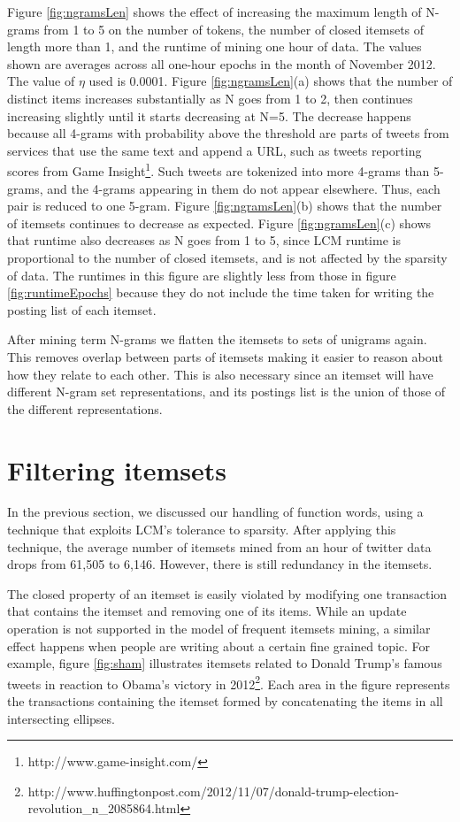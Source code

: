 \documentclass{sig-alternate}
\begin{document}
Figure \ref{fig:ngramsLen} shows the effect of increasing the maximum length
of N-grams from 1 to 5 on the number of tokens, the number of closed itemsets
of length more than 1, and the runtime of mining one hour of data.
The values shown are averages across all one-hour epochs in the month of
November 2012.
The value of $\eta$ used is 0.0001.
Figure \ref{fig:ngramsLen}(a) shows that the number of distinct items
increases substantially as N goes from 1 to 2, then continues increasing
slightly until it starts decreasing at N=5.
The decrease happens because all 4-grams with probability above the threshold
are parts of tweets from services that use the same text and append a URL,
such as tweets reporting scores from
Game Insight\footnote{http://www.game-insight.com/}.
Such tweets are tokenized into more 4-grams than 5-grams, and the 4-grams
appearing in them do not appear elsewhere.
Thus, each pair is reduced to one 5-gram.
Figure \ref{fig:ngramsLen}(b) shows that the number of itemsets continues to
decrease as expected.
Figure \ref{fig:ngramsLen}(c) shows that runtime also decreases as N goes
from 1 to 5, since LCM runtime is proportional to the number of closed
itemsets, and is not affected by the sparsity of data.
The runtimes in this figure are slightly less from those in
figure \ref{fig:runtimeEpochs} because they do not include the time taken for
writing the posting list of each itemset.


After mining term N-grams we flatten the itemsets to sets of unigrams again.
This removes overlap between parts of itemsets making it easier to reason
about how they relate to each other. 
This is also necessary since an itemset will have different N-gram set
representations,
and its postings list is the union of those of the different representations.



\section{Filtering itemsets}
\label{sec:strong}


In the previous section, we discussed our handling of function words,
using a technique that exploits LCM's tolerance to sparsity.
After applying this technique, the average number of itemsets mined from an
hour of twitter data drops from 61,505 to 6,146.
However, there is still redundancy in the itemsets.

The closed property of an itemset is easily violated by modifying one
transaction that contains the itemset and removing one of its items.
While an update operation is not supported in the model of frequent itemsets
mining, a similar effect happens when people are writing about a certain fine
grained topic.
For example, figure \ref{fig:sham} illustrates  itemsets related to Donald
Trump's famous tweets in reaction to Obama's victory in
2012\footnote{http://www.huffingtonpost.com/2012/11/07/donald-trump-election-revolution\_n\_2085864.html}.  
Each area in the figure represents the transactions containing the itemset
formed by concatenating the items in all intersecting ellipses.  
\end{document}
